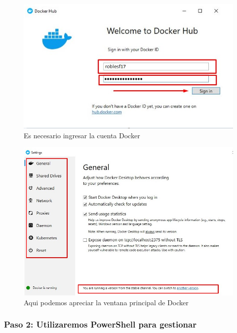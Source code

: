 \documentclass[preprint,12pt]{elsarticle}
\begin{document}
\begin{figure}[H]
	\begin{center}
		\includegraphics[width=12cm]{./IMAGENES/foto3} 
		\caption{Es necesario ingresar la cuenta Docker}
	\end{center}
\end{figure}

\begin{figure}[H]
	\begin{center}
		\includegraphics[width=12cm]{./IMAGENES/foto4} 
		\caption{Aqui podemos apreciar la ventana principal de Docker}
	\end{center}
\end{figure}

\subsubsection{\textbf{Paso 2: Utilizaremos PowerShell para gestionar}}
\end{document}
